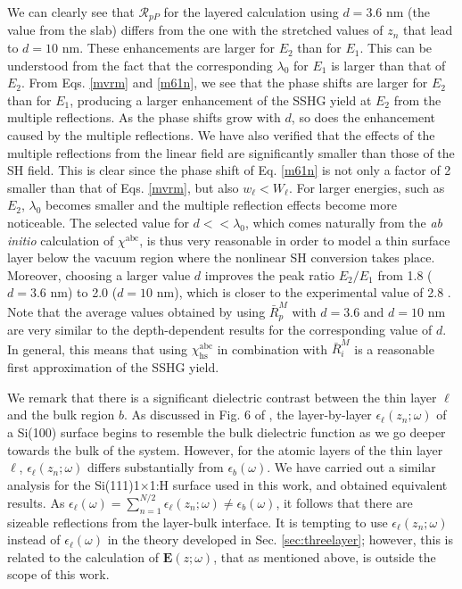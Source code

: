 \documentclass[utf8]{frontiersSCNS}
\begin{document}
We can clearly see that $\mathcal{R}_{pP}$ for the layered calculation using $d
= 3.6$ nm (the value from the slab) differs from the one with the stretched
values of $z_{n}$ that lead to $d = 10$ nm. These enhancements are larger for
$E_{2}$ than for $E_{1}$. This can be understood from the fact that the
corresponding $\lambda_{0}$ for $E_{1}$ is larger than that of $E_{2}$. From
Eqs. \eqref{mvrm} and \eqref{m61n}, we see that the phase shifts are larger for
$E_{2}$ than for $E_{1}$, producing a larger enhancement of the SSHG yield at
$E_{2}$ from the multiple reflections. As the phase shifts grow with $d$, so
does the enhancement caused by the multiple reflections. We have also verified
that the effects of the multiple reflections from the linear field are
significantly smaller than those of the SH field. This is clear since the phase
shift of Eq. \eqref{m61n} is not only a factor of 2 smaller than that of Eqs.
\eqref{mvrm}, but also $w_{\ell} < W_{\ell}$. For larger energies, such as
$E_{2}$, $\lambda_{0}$ becomes smaller and the multiple reflection effects
become more noticeable. The selected value for $d << \lambda_{0}$, which comes
naturally from the \emph{ab initio} calculation of $\chi^{\mathrm{abc}}$, is
thus very reasonable in order to model a thin surface layer below the vacuum
region where the nonlinear SH conversion takes place. Moreover, choosing a
larger value $d$ improves the peak ratio $E_{2}/E_{1}$ from 1.8 ($d=3.6$ nm) to
2.0 ($d=10$ nm), which is closer to the experimental value of 2.8
\citep{andersonPRB16b}.
Note that the average values obtained by using $\bar{R}^{M}_{p}$ with $d = 3.6$
and $d = 10$ nm are very similar to the depth-dependent results for the
corresponding value of $d$. In general, this means that using
$\chi^{\mathrm{abc}}_{\mathrm{hs}}$ in combination with $\bar{R}^{M}_{i}$ is a
reasonable first approximation of the SSHG yield.

We remark that there is a significant dielectric contrast between the thin layer
$\ell$ and the bulk region $b$. As discussed in Fig. 6 of \cite{mendozaPRB06},
the layer-by-layer $\epsilon_{\ell}(z_{n};\omega)$ of a Si(100) surface begins
to resemble the bulk dielectric function as we go deeper towards the bulk of the
system. However, for the atomic layers of the thin layer $\ell$,
$\epsilon_{\ell}(z_{n};\omega)$ differs substantially from
$\epsilon_{b}(\omega)$. We have carried out a similar analysis for the
Si(111)1$\times$1:H surface used in this work, and obtained equivalent results.
As $\epsilon_{\ell}(\omega)=\sum_{n=1}^{N/2}\epsilon_{\ell}(z_{n};\omega)\neq
\epsilon_{b}(\omega)$, it follows that there are sizeable reflections from the
layer-bulk interface. It is tempting to use $\epsilon_{\ell}(z_{n};\omega)$
instead of $\epsilon_{\ell}(\omega)$ in the theory developed in Sec.
\ref{sec:threelayer}; however, this is related to the calculation of
$\mathbf{E}(z;\omega)$, that as mentioned above, is outside the scope of this
work.
\end{document}
